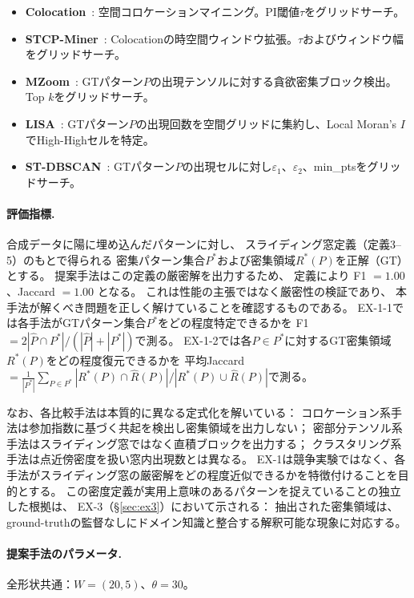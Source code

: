 \begin{itemize}
\item \textbf{Colocation}~\cite{shekhar2001colocation}: 空間コロケーションマイニング。PI閾値$\tau$をグリッドサーチ。
\item \textbf{STCP-Miner}~\cite{qian2009stcolocation}: Colocationの時空間ウィンドウ拡張。$\tau$およびウィンドウ幅をグリッドサーチ。
\item \textbf{MZoom}~\cite{shin2018mzoom}: GTパターン$P$の出現テンソルに対する貪欲密集ブロック検出。Top $k$をグリッドサーチ。
\item \textbf{LISA}~\cite{anselin1995lisa}: GTパターン$P$の出現回数を空間グリッドに集約し、Local Moran's $I$でHigh-Highセルを特定。
\item \textbf{ST-DBSCAN}~\cite{birant2007stdbscan}: GTパターン$P$の出現セルに対し$\varepsilon_1$、$\varepsilon_2$、min\_ptsをグリッドサーチ。
\end{itemize}

\paragraph{評価指標.}
合成データに陽に埋め込んだパターンに対し、
スライディング窓定義（定義3--5）のもとで得られる
密集パターン集合$P^*$および密集領域$R^*(P)$を正解（GT）とする。
提案手法はこの定義の厳密解を出力するため、
定義により F1 $= 1.00$、Jaccard $= 1.00$ となる。
これは性能の主張ではなく厳密性の検証であり、
本手法が解くべき問題を正しく解けていることを確認するものである。
EX-1-1では各手法がGTパターン集合$P^*$をどの程度特定できるかを
F1 $= 2|\hat{P} \cap P^*| / (|\hat{P}| + |P^*|)$で測る。
EX-1-2では各$P \in P^*$に対するGT密集領域$R^*(P)$をどの程度復元できるかを
平均Jaccard $= \frac{1}{|P^*|}\sum_{P \in P^*} |R^*(P) \cap \hat{R}(P)| / |R^*(P) \cup \hat{R}(P)|$で測る。

なお、各比較手法は本質的に異なる定式化を解いている：
コロケーション系手法は参加指数に基づく共起を検出し密集領域を出力しない；
密部分テンソル系手法はスライディング窓ではなく直積ブロックを出力する；
クラスタリング系手法は点近傍密度を扱い窓内出現数とは異なる。
EX-1は競争実験ではなく、各手法がスライディング窓の厳密解をどの程度近似できるかを特徴付けることを目的とする。
この密度定義が実用上意味のあるパターンを捉えていることの独立した根拠は、
EX-3（\S\ref{sec:ex3}）において示される：
抽出された密集領域は、ground-truthの監督なしにドメイン知識と整合する解釈可能な現象に対応する。

\paragraph{提案手法のパラメータ.}
全形状共通：$W = (20, 5)$、$\theta = 30$。

